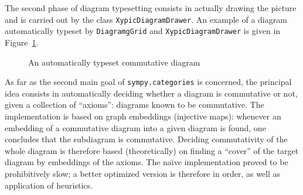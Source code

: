 The second phase of diagram typesetting consists in actually drawing the picture
and is carried out by the class \texttt{XypicDiagramDrawer}.  An example of a
diagram automatically typeset by \texttt{DiagramgGrid} and
\texttt{XypicDiagramDrawer} is given in Figure~\ref{fig:cat:loops}.
\begin{figure}[h]
  \centerline{
  }
  \caption{An automatically typeset commutative diagram}\label{fig:cat:loops}
\end{figure}

As far as the second main goal of \texttt{sympy.categories} is concerned, the principal idea
consists in automatically deciding whether a diagram is commutative or not,
given a collection of ``axioms'': diagrams known to be commutative. The
implementation is based on graph embeddings (injective maps): whenever an
embedding of a commutative diagram into a given diagram is found, one
concludes that the subdiagram is commutative. Deciding commutativity of the
whole diagram is therefore based (theoretically) on finding a ``cover'' of the
target diagram by embeddings of the axioms. The na\"{\i}ve implementation
proved to be prohibitively slow; a better optimized version is therefore in
order, as well as application of heuristics.
